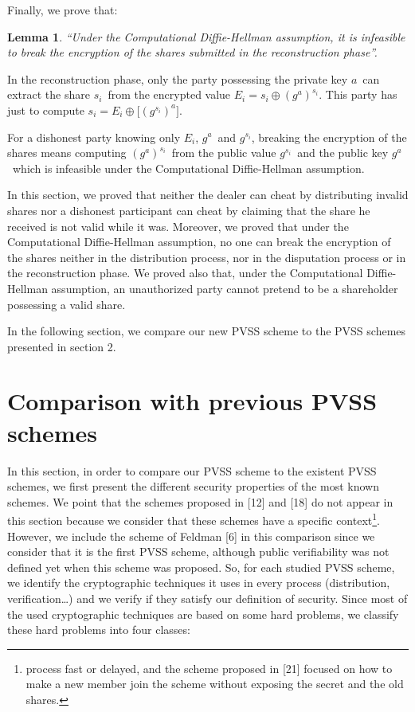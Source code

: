 \documentclass[submission,copyright,creativecommons]{eptcs}
\newtheorem{lemma}[theorem]{Lemma}
\newenvironment{proof}[1][Proof]{\begin{trivlist}
\item[\hskip \labelsep {\bfseries #1}]}{\end{trivlist}}
\begin{document}
Finally, we prove that:

\begin{lemma}
\textquotedblleft Under the Computational Diffie-Hellman assumption, it is
infeasible to break the encryption of the shares submitted in the
reconstruction phase\textquotedblright .
\end{lemma}

\begin{proof}
In the reconstruction phase, only the party possessing the private key $a$\
can extract the share $s_{i}$\ from the encrypted value $E_{i}=s_{i}\oplus
(g^{a})^{s_{i}}$. This party has just to compute $s_{i}=E_{i}\oplus \lbrack
(g^{s_{i}})^{a}]$. 

For a dishonest party knowing only $E_{i}$, $g^{a}$\ and $g^{s_{i}}$, breaking the encryption of the shares means computing $(g^{a})^{s_{i}}$\ from the public value $g^{s_{i}}$\ and the public key $g^{a}$\ which is infeasible under the Computational Diffie-Hellman
assumption.
\end{proof}

In this section, we proved that neither the dealer can cheat by distributing
invalid shares nor a dishonest participant can cheat by claiming that the
share he received is not valid while it was. Moreover, we proved that under
the Computational Diffie-Hellman assumption, no one can break the encryption
of the shares neither in the distribution process, nor in the disputation
process or in the reconstruction phase. We proved also that, under the
Computational Diffie-Hellman assumption, an unauthorized party cannot
pretend to be a shareholder possessing a valid share.

In the following section, we compare our new PVSS scheme to the PVSS schemes
presented in section 2.

\section{Comparison with previous PVSS schemes}

In this section, in order to compare our PVSS scheme to the existent PVSS
schemes, we first present the different security properties of the most
known schemes. We point that the schemes proposed in [12] and [18] do not
appear in this section because we consider that these schemes have a
specific context\footnote{process fast or delayed, and the scheme proposed in [21] focused on how to
make a new member join the scheme without exposing the secret and the old
shares.}. However, we include the scheme of Feldman [6] in this comparison
since we consider that it is the first PVSS scheme, although public
verifiability was not defined yet when this scheme was proposed. So, for each studied PVSS scheme, we identify the cryptographic techniques it uses in every process (distribution, verification\ldots ) and we verify
if they satisfy our definition of security. Since most of the used
cryptographic techniques are based on some hard problems, we classify these
hard problems into four classes:
\end{document}
